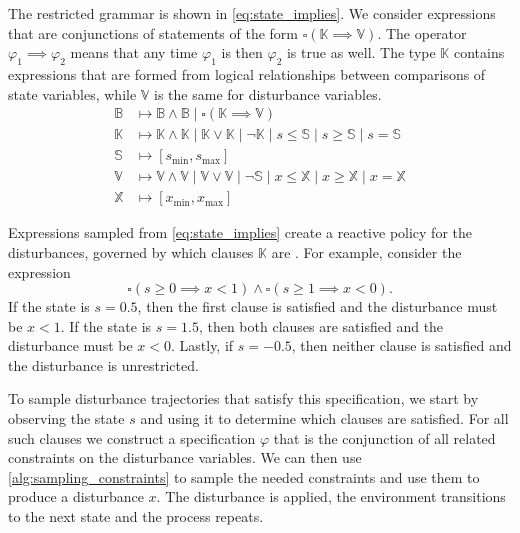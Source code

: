 The restricted grammar is shown in \cref{eq:state_implies}. We consider expressions that are conjunctions of statements of the form $\square (\mathbb{K} \implies \mathbb{V})$. The operator $\varphi_1 \implies \varphi_2$ means that any time $\varphi_1$ is \True{} then $\varphi_2$ is true as well. The type $\mathbb{K}$ contains expressions that are formed from logical relationships between comparisons of state variables, while $\mathbb{V}$ is the same for disturbance variables. 
\begin{equation}
\label{eq:state_implies}
\begin{split}
    \mathbb{B} &\mapsto \mathbb{B} \land \mathbb{B} \mid \square (\mathbb{K} \implies \mathbb{V}) \\
    \mathbb{K} &\mapsto \mathbb{K} \land \mathbb{K} \mid \mathbb{K} \lor \mathbb{K} \mid \neg \mathbb{K} \mid s \leq \mathbb{S} \mid s \geq \mathbb{S} \mid s = \mathbb{S} \\
    \mathbb{S} &\mapsto [s_{\min},s_{\max}] \\
    \mathbb{V} &\mapsto \mathbb{V} \land \mathbb{V} \mid \mathbb{V} \lor \mathbb{V} \mid \neg \mathbb{S} \mid x \leq \mathbb{X} \mid x \geq \mathbb{X} \mid x = \mathbb{X} \\
    \mathbb{X} &\mapsto [x_{\min},x_{\max}]
\end{split}
\end{equation}

Expressions sampled from \cref{eq:state_implies} create a reactive policy for the disturbances, governed by which clauses $\mathbb{K}$ are \True{}. For example, consider the expression
\begin{equation}
    \square ( s \geq 0 \implies x < 1) \land \square ( s  \geq 1 \implies x < 0) \text{.}
\end{equation}
If the state is $s=0.5$, then the first clause is satisfied and the disturbance must be $x < 1$. If the state is $s=1.5$, then both clauses are satisfied and the disturbance must be $x < 0$. Lastly, if $s = -0.5$, then neither clause is satisfied and the disturbance is unrestricted. 

To sample disturbance trajectories that satisfy this specification, we start by observing the state $s$ and using it to determine which clauses are satisfied. For all such clauses we construct a specification $\varphi$ that is the conjunction of all related constraints on the disturbance variables. We can then use \cref{alg:sampling_constraints} to sample the needed constraints and use them to produce a disturbance $x$. The disturbance is applied, the environment transitions to the next state and the process repeats.


